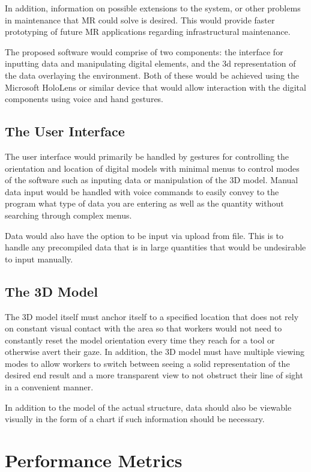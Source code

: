 \documentclass[10pt,draftclsnofoot,onecolumn]{IEEEtran}
\begin{document}
	In addition, information on possible extensions to the system, or other
	problems in maintenance that MR could solve is desired. This would provide
	faster prototyping of future MR applications regarding infrastructural
	maintenance.

	The proposed software would comprise of two components: the interface for
	inputting data and manipulating digital elements, and the 3d representation
	of the data overlaying the environment. Both of these would be achieved
	using the Microsoft HoloLens or similar device that would allow interaction
	with the digital components using voice and hand gestures.

	\subsection*{The User Interface}

	The user interface would primarily be handled by gestures for controlling
	the orientation and location of digital models with minimal menus to
	control modes of the software such as inputing data or manipulation of the
	3D model. Manual data input would be handled with voice commands to easily
	convey to the program what type of data you are entering as well as the
	quantity without searching through complex menus.

	Data would also have the option to be input via upload from file. This is
	to handle any precompiled data that is in large quantities that would be
	undesirable to input manually.

	\subsection*{The 3D Model}

	The 3D model itself must anchor itself to a specified location that does
	not rely on constant visual contact with the area so that workers would not
	need to constantly reset the model orientation every time they reach for a
	tool or otherwise avert their gaze. In addition, the 3D model must have
	multiple viewing modes to allow workers to switch between seeing a solid
	representation of the desired end result and a more transparent view to not
	obstruct their line of sight in a convenient manner.

	In addition to the model of the actual structure, data should also be
	viewable visually in the form of a chart if such information should be
	necessary.

	\section*{Performance Metrics}
\end{document}
